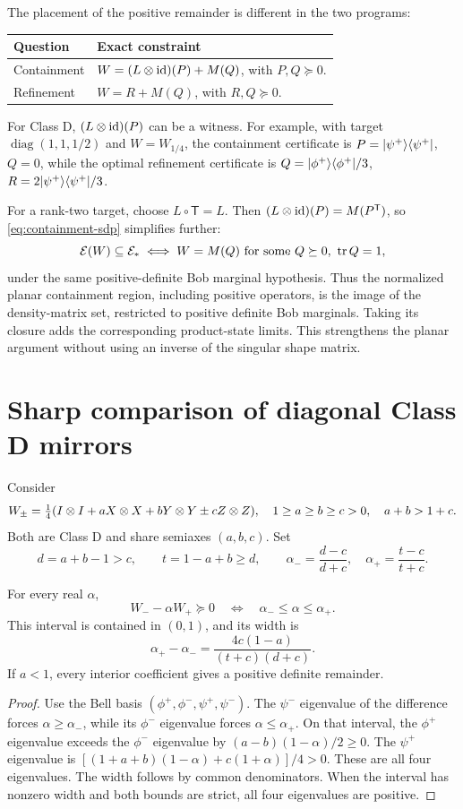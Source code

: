 The placement of the positive remainder is different in the two programs:
\begin{center}
\begin{tabularx}{\linewidth}{@{}l X@{}}
\toprule
Question & Exact constraint\\
\midrule
Containment & $W=(L\otimes\operatorname{id})(P)+M(Q)$, with $P,Q\succeq0$.\\
Refinement & $W=R+M(Q)$, with $R,Q\succeq0$.\\
\bottomrule
\end{tabularx}
\end{center}
For Class D, $(L\otimes\operatorname{id})(P)$ can be a witness. For example, with target $\operatorname{diag}(1,1,1/2)$ and $W=W_{1/4}$, the containment certificate is $P=\lvert \psi^+\rangle\langle \psi^+\rvert$, $Q=0$, while the optimal refinement certificate is $Q=\lvert \phi^+\rangle\langle \phi^+\rvert/3$, $R=2\lvert \psi^+\rangle\langle \psi^+\rvert/3$.

For a rank-two target, choose $L\circ\mathsf T=L$. Then $(L\otimes\operatorname{id})(P)=M(P^{\mathsf T})$, so \eqref{eq:containment-sdp} simplifies further:
\[
 \mathcal E(W)\subseteq\mathcal E_*
 \iff W=M(Q)\ \text{for some }Q\succeq0,\ \operatorname{tr} Q=1,
\]
under the same positive-definite Bob marginal hypothesis. Thus the normalized planar containment region, including positive operators, is the image of the density-matrix set, restricted to positive definite Bob marginals. Taking its closure adds the corresponding product-state limits. This strengthens the planar argument without using an inverse of the singular shape matrix.

\section{Sharp comparison of diagonal Class D mirrors}

Consider
\[
 W_\pm=\tfrac14(I\otimes I+aX\otimes X+bY\otimes Y\pm cZ\otimes Z),
 \quad 1\geq a\geq b\geq c>0,\quad a+b>1+c.
\]
Both are Class D and share semiaxes $(a,b,c)$. Set
\[
 d=a+b-1>c,\qquad t=1-a+b\geq d,
 \qquad \alpha_-=\frac{d-c}{d+c},\quad\alpha_+=\frac{t-c}{t+c}.
\]

\begin{theorem}\label{thm:sharp-mirror}
For every real $\alpha$,
\begin{equation}\label{eq:sharp-interval}
 W_--\alpha W_+\succeq0
 \quad\Longleftrightarrow\quad
 \alpha_-\leq\alpha\leq\alpha_+.
\end{equation}
This interval is contained in $(0,1)$, and its width is
\[
 \alpha_+-\alpha_-=\frac{4c(1-a)}{(t+c)(d+c)}.
\]
If $a<1$, every interior coefficient gives a positive definite remainder.
\end{theorem}
\begin{proof}
Use the Bell basis $(\phi^+,\phi^-,\psi^+,\psi^-)$. The $\psi^-$ eigenvalue of the difference forces $\alpha\geq\alpha_-$, while its $\phi^-$ eigenvalue forces $\alpha\leq\alpha_+$. On that interval, the $\phi^+$ eigenvalue exceeds the $\phi^-$ eigenvalue by $(a-b)(1-\alpha)/2\geq0$. The $\psi^+$ eigenvalue is $[(1+a+b)(1-\alpha)+c(1+\alpha)]/4>0$. These are all four eigenvalues. The width follows by common denominators. When the interval has nonzero width and both bounds are strict, all four eigenvalues are positive.
\end{proof}

